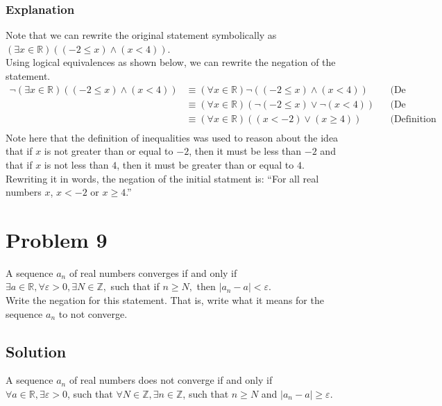 \documentclass[table]{article}
\begin{document}
\subsubsection{Explanation}
Note that we can rewrite the original statement symbolically as $(\exists x \in \mathbb{R})((-2 \leq x) \land (x < 4))$.\\
Using logical equivalences as shown below, we can rewrite the negation of the statement.\\
\begin{align*}
\neg (\exists x \in \mathbb{R})((-2 \leq x) \land (x < 4))
&\equiv (\forall x \in \mathbb{R})\neg((-2 \leq x) \land (x < 4)) && \text{(De Morgan's Law of Quantifiers)}\\
&\equiv (\forall x \in \mathbb{R})(\neg(-2 \leq x) \lor \neg(x < 4)) && \text{(De Morgan's Law of Propositional Logic)}\\
&\equiv (\forall x \in \mathbb{R})((x < -2) \lor (x \geq 4)) && \text{(Definition of Inequalities)}\\
\end{align*}
Note here that the definition of inequalities was used to reason about the idea that if $x$ is not greater than or equal to $-2$, then it must be less than $-2$ and that if $x$ is not less than $4$, then it must be greater than or equal to $4$.\\
Rewriting it in words, the negation of the initial statment is: ``For all real numbers $x$, $x < -2$ or $x \geq 4$.''
\section{Problem 9}
A sequence $a_n$ of real numbers converges if and only if\\
$\exists a \in \mathbb{R}, \forall \varepsilon > 0, \exists N \in \mathbb{Z},$ such that if $n \geq N,$ then $|a_n - a| < \varepsilon$.\\
Write the negation for this statement. That is, write what it means for the sequence $a_n$ to not converge.
\subsection{Solution}
A sequence $a_n$ of real numbers does not converge if and only if\\
$\forall a \in \mathbb{R}, \exists \varepsilon > 0$, such that $\forall N \in \mathbb{Z}, \exists n \in \mathbb{Z}$, such that $n \geq N$ and $|a_n - a| \geq \varepsilon$.
\end{document}
